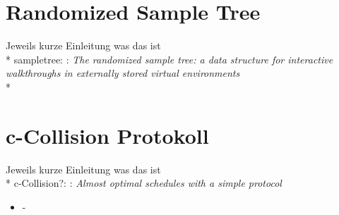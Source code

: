 \section{Randomized Sample Tree}
Jeweils kurze Einleitung was das ist\\*
sampletree: \cite{klein}: \textit{The randomized sample tree: a data structure for interactive walkthroughs in externally stored virtual environments}\\*

\section{c-Collision Protokoll}
Jeweils kurze Einleitung was das ist\\*
c-Collision?: \cite{DBLP:conf/arcs/RehbergS99}: \textit{Almost optimal schedules with a simple protocol}
\begin{itemize}
 \item -
\end{itemize}


